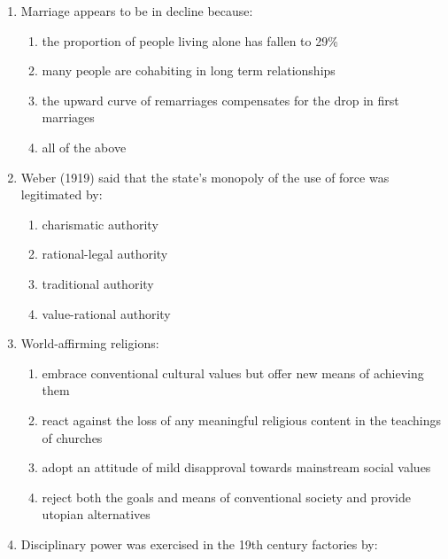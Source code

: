 \documentclass[12pt]{article}
\begin{document}
\begin{enumerate}[label=\arabic*.]
\begin{enumerate}[label=(\alph*)]
    \item there are no clearly defined projects into which the money can be directed
    \item the United Nations has refused to call on rich countries to provide it
    \item debt repayments with interest can be greater than the amount of money received
    \item debt repayments with interest can be greater than the amount of money received
\end{enumerate}
\item Marriage appears to be in decline because:
\begin{enumerate}[label=(\alph*)]
    \item the proportion of people living alone has fallen to 29\%
    \item many people are cohabiting in long term relationships
    \item the upward curve of remarriages compensates for the drop in first marriages
    \item all of the above
\end{enumerate}
\item Weber (1919) said that the state's monopoly of the use of force was legitimated by:
\begin{enumerate}[label=(\alph*)]
    \item charismatic authority
    \item rational-legal authority
    \item traditional authority
    \item value-rational authority
\end{enumerate}
\item World-affirming religions:
\begin{enumerate}[label=(\alph*)]
    \item embrace conventional cultural values but offer new means of achieving them
    \item react against the loss of any meaningful religious content in the teachings of churches
    \item adopt an attitude of mild disapproval towards mainstream social values
    \item reject both the goals and means of conventional society and provide utopian alternatives
\end{enumerate}
\item Disciplinary power was exercised in the 19th century factories by:

\end{enumerate}
\end{document}
